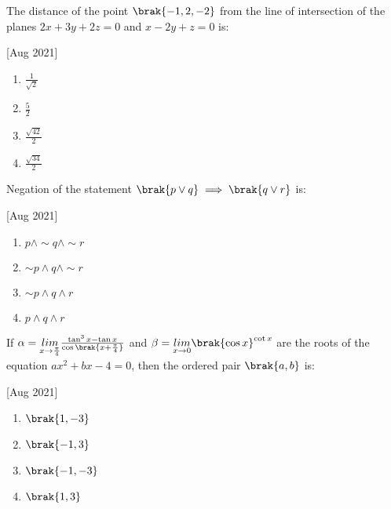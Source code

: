     \item The distance of the point $\brak{-1, 2, -2}$ from the line of intersection of the planes $2x+3y+2z=0$ and $x-2y+z=0$ is:
    
    \hfill[Aug 2021]

        \begin{multicols}{4}
            \begin{enumerate}
                \item $\frac{1}{\sqrt{2}}$
                \item $\frac{5}{2}$
                \item $\frac{\sqrt{42}}{2}$
                \item $\frac{\sqrt{34}}{2}$
            \end{enumerate}
        \end{multicols}

    \item Negation of the statement $\brak{p\lor q}\implies\brak{q\lor r}$ is:
    
    \hfill[Aug 2021]

        \begin{multicols}{4}
            \begin{enumerate}
                \item $p\land \sim q\land \sim r$
                \item $\sim p\land q\land \sim r$
                \item $\sim p\land q\land r$
                \item $p\land q\land r$
            \end{enumerate}
        \end{multicols}
		
    \item If $\alpha=\underset{x\to\frac{\pi}{4}}{lim}\frac{\tan^3 x-\tan x}{\cos\brak{x+\frac{\pi}{4}}}$ and $\beta=\underset{x\to 0}{lim}\brak{\cos x}^{\cot x}$ are the roots of the equation $ax^2+bx-4=0$, then the ordered pair $\brak{a,b}$ is:
    
    \hfill[Aug 2021]

        \begin{multicols}{4}
            \begin{enumerate}
                \item $\brak{1,-3}$
                \item $\brak{-1,3}$
                \item $\brak{-1,-3}$
                \item $\brak{1,3}$
            \end{enumerate}
        \end{multicols}

